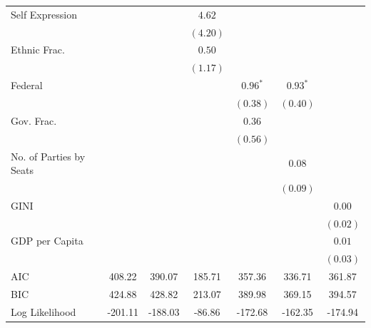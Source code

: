 \documentclass[a4paper]{article}\usepackage[]{graphicx}\usepackage[]{color}
\begin{document}
\begin{table}
\begin{center}
\begin{tabular}{l c c c c c c }
Self Expression         &               &               & $4.62$       &               &              &              \\
                        &               &               & $(4.20)$     &               &              &              \\
Ethnic Frac.            &               &               & $0.50$       &               &              &              \\
                        &               &               & $(1.17)$     &               &              &              \\
Federal                 &               &               &              & $0.96^{*}$    & $0.93^{*}$   &              \\
                        &               &               &              & $(0.38)$      & $(0.40)$     &              \\
Gov. Frac.              &               &               &              & $0.36$        &              &              \\
                        &               &               &              & $(0.56)$      &              &              \\
No. of Parties by Seats &               &               &              &               & $0.08$       &              \\
                        &               &               &              &               & $(0.09)$     &              \\
GINI                    &               &               &              &               &              & $0.00$       \\
                        &               &               &              &               &              & $(0.02)$     \\
GDP per Capita          &               &               &              &               &              & $0.01$       \\
                        &               &               &              &               &              & $(0.03)$     \\
\hline
AIC                     & 408.22        & 390.07        & 185.71       & 357.36        & 336.71       & 361.87       \\
BIC                     & 424.88        & 428.82        & 213.07       & 389.98        & 369.15       & 394.57       \\
Log Likelihood          & -201.11       & -188.03       & -86.86       & -172.68       & -162.35      & -174.94      \\

\end{tabular}
\end{center}
\end{table}
\end{document}
